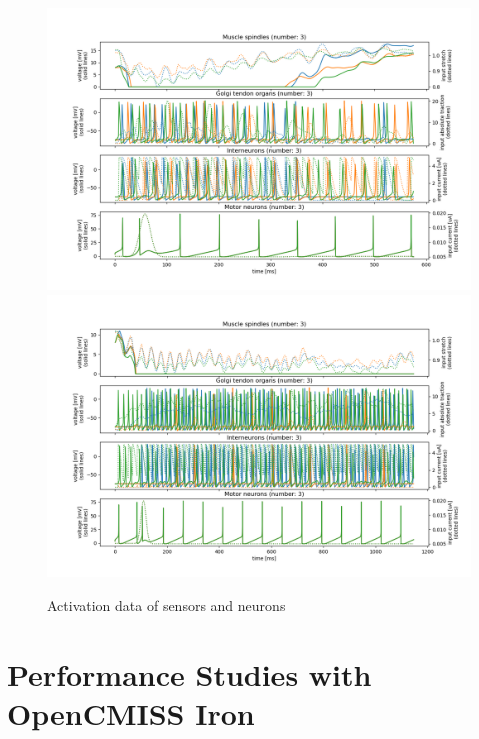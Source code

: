 \begin{figure}[H]
  \centering%
  \includegraphics[width=\textwidth]{images/results/application/neuromuscular_mileusnic_out0.png}\\
  \includegraphics[width=\textwidth]{images/results/application/neuromuscular_mileusnic_out1.png}\\
  \caption{Activation data of sensors and neurons}%
  \label{fig:neuromuscular_schematic}%
\end{figure}

\fi
\iffalse
\section{Performance Studies with OpenCMISS Iron}

